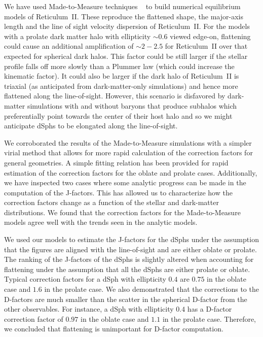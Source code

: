 \documentclass[prd,twocolumn,showpacs,preprintnumbers,superscriptaddress,nofootinbib,amsmath,amssymb,nobalancelastpage]{revtex4}
\begin{document}
We have used Made-to-Measure techniques ~\citep{Sy96,De09} to
build numerical equilibrium models of Reticulum~II. These reproduce the flattened
shape, the major-axis length and the line of sight velocity dispersion of Reticulum~II. For the models with a prolate dark matter halo with ellipticity $\sim
0.6$ viewed edge-on, flattening could cause an additional
amplification of $\sim 2-2.5$ for Reticulum~II over that expected
for spherical dark halos. This factor could be still larger if the
stellar profile falls off more slowly than a Plummer law (which could
increase the kinematic factor). It could also be larger if the dark halo of Reticulum~II is triaxial (as anticipated from dark-matter-only simulations) and hence more flattened along the line-of-sight. However, this scenario is disfavored by dark-matter simulations with and without baryons that produce subhalos which preferentially point towards the center of their host halo and so we might anticipate dSphs to be elongated along the line-of-sight.

We corroborated the results of the Made-to-Measure simulations with a simpler virial method that allows for more rapid calculation of the correction factors for general geometries. A simple fitting relation has been provided for rapid estimation of the correction factors for the oblate and prolate cases. Additionally, we have inspected two cases where some analytic progress can be made in the computation of the J-factors. This has allowed us to characterize how the correction factors change as a function of the stellar and dark-matter distributions. We found that the correction factors for the Made-to-Measure models agree well with the trends seen in the analytic models.

We used our models to estimate the J-factors for the dSphs under the assumption that the figures are aligned with the line-of-sight and are either oblate or prolate. The ranking of the J-factors of the dSphs is slightly altered when accounting for flattening under the assumption that all the dSphs are either prolate or oblate. Typical correction factors for a dSph with ellipticity $0.4$ are $0.75$ in the oblate case and $1.6$ in the prolate case. We also demonstrated that the corrections to the D-factors are much smaller than the scatter in the spherical D-factor from the other observables. For instance, a dSph with ellipticity $0.4$ has a D-factor correction factor of $0.97$ in the oblate case and $1.1$ in the prolate case. Therefore, we concluded that flattening is unimportant for D-factor computation.
\end{document}
